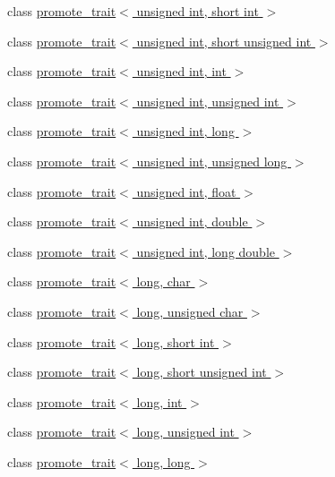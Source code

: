 \begin{DoxyCompactItemize}
\item 
class \hyperlink{classpromote__trait_3_01unsigned_01int_00_01short_01int_01_4}{promote\+\_\+trait$<$ unsigned int, short int $>$}
\item 
class \hyperlink{classpromote__trait_3_01unsigned_01int_00_01short_01unsigned_01int_01_4}{promote\+\_\+trait$<$ unsigned int, short unsigned int $>$}
\item 
class \hyperlink{classpromote__trait_3_01unsigned_01int_00_01int_01_4}{promote\+\_\+trait$<$ unsigned int, int $>$}
\item 
class \hyperlink{classpromote__trait_3_01unsigned_01int_00_01unsigned_01int_01_4}{promote\+\_\+trait$<$ unsigned int, unsigned int $>$}
\item 
class \hyperlink{classpromote__trait_3_01unsigned_01int_00_01long_01_4}{promote\+\_\+trait$<$ unsigned int, long $>$}
\item 
class \hyperlink{classpromote__trait_3_01unsigned_01int_00_01unsigned_01long_01_4}{promote\+\_\+trait$<$ unsigned int, unsigned long $>$}
\item 
class \hyperlink{classpromote__trait_3_01unsigned_01int_00_01float_01_4}{promote\+\_\+trait$<$ unsigned int, float $>$}
\item 
class \hyperlink{classpromote__trait_3_01unsigned_01int_00_01double_01_4}{promote\+\_\+trait$<$ unsigned int, double $>$}
\item 
class \hyperlink{classpromote__trait_3_01unsigned_01int_00_01long_01double_01_4}{promote\+\_\+trait$<$ unsigned int, long double $>$}
\item 
class \hyperlink{classpromote__trait_3_01long_00_01char_01_4}{promote\+\_\+trait$<$ long, char $>$}
\item 
class \hyperlink{classpromote__trait_3_01long_00_01unsigned_01char_01_4}{promote\+\_\+trait$<$ long, unsigned char $>$}
\item 
class \hyperlink{classpromote__trait_3_01long_00_01short_01int_01_4}{promote\+\_\+trait$<$ long, short int $>$}
\item 
class \hyperlink{classpromote__trait_3_01long_00_01short_01unsigned_01int_01_4}{promote\+\_\+trait$<$ long, short unsigned int $>$}
\item 
class \hyperlink{classpromote__trait_3_01long_00_01int_01_4}{promote\+\_\+trait$<$ long, int $>$}
\item 
class \hyperlink{classpromote__trait_3_01long_00_01unsigned_01int_01_4}{promote\+\_\+trait$<$ long, unsigned int $>$}
\item 
class \hyperlink{classpromote__trait_3_01long_00_01long_01_4}{promote\+\_\+trait$<$ long, long $>$}

\end{DoxyCompactItemize}

